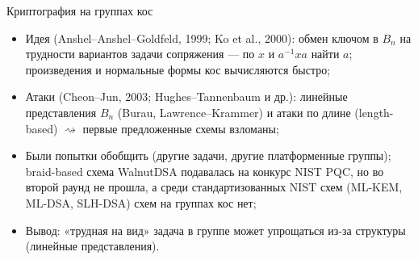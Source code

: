 \documentclass[serif, aspectratio=169]{beamer}
\begin{document}
\begin{frame}{Криптография на группах кос}
    \begin{itemize}
        \item Идея (Anshel--Anshel--Goldfeld, 1999; Ko et al., 2000): обмен ключом в $B_n$ на трудности вариантов задачи сопряжения --- по $x$ и $a^{-1}xa$ найти $a$; произведения и нормальные формы кос вычисляются быстро;
        \item Атаки (Cheon--Jun, 2003; Hughes--Tannenbaum и др.): линейные представления $B_n$ (Burau, Lawrence--Krammer) и атаки по длине (length-based) $\rightsquigarrow$ первые предложенные схемы взломаны;
        \item Были попытки обобщить (другие задачи, другие платформенные группы); braid-based схема WalnutDSA подавалась на конкурс NIST PQC, но во второй раунд не прошла, а среди стандартизованных NIST схем (ML-KEM, ML-DSA, SLH-DSA) схем на группах кос нет;
        \item Вывод: «трудная на вид» задача в группе может упрощаться из-за структуры (линейные представления).
    \end{itemize}
    \note{
        \begin{itemize}
            \item ---
        \end{itemize}
    }
\end{frame}

\end{document}
